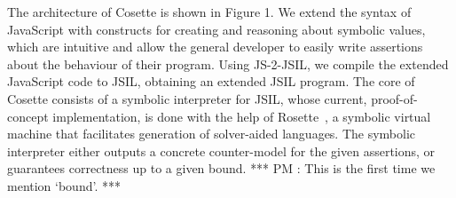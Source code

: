 \documentclass[acmsmall,review,anonymous]{acmart}\settopmatter{printfolios=true,printccs=false,printacmref=false}
\def\jsinline{\lstinline[language=JavaScript, basicstyle=\small]}
\newcommand{\jsil}{JSIL\xspace}
\newcommand{\JSComp}{JS-2-JSIL\xspace}
\newcommand{\jilette}{Cosette\xspace}
\newcommand{\myparagraph}[1]{\smallskip\noindent {\bf #1.}\hspace{1pt}}
\newcommand{\pmaxinline}[1]{ {\color{blue} *** PM : #1 ***} }
\begin{document}
\myparagraph{Architecture} The architecture of \jilette is shown in Figure 1. We extend the syntax of JavaScript with constructs for creating and reasoning about symbolic values, which are intuitive and allow the general developer to easily write assertions about the behaviour of their program. Using \JSComp, we compile the extended JavaScript code to \jsil, obtaining an extended \jsil program. The core of \jilette consists of a symbolic interpreter for
\jsil, whose current, proof-of-concept implementation, is done with the help of Rosette~\cite{Rosette2,Rosette1}, a symbolic virtual machine that facilitates generation of solver-aided languages. The symbolic interpreter either outputs a concrete counter-model for the given assertions, or guarantees correctness up to a given bound. \pmaxinline{This is the first time we mention `bound'.}


\end{document}
